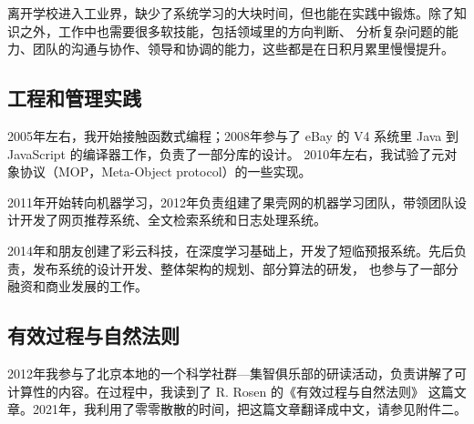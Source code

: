 \documentclass[a4paper,12pt]{article}
\numberwithin{problem}{section}
\numberwithin{definition}{section}
\numberwithin{lemma}{section}
\numberwithin{proposition}{section}
\numberwithin{theorem}{section}
\numberwithin{grammar}{section}
\numberwithin{program}{section}
\numberwithin{convention}{section}
\numberwithin{corollary}{section}
\begin{document}
离开学校进入工业界，缺少了系统学习的大块时间，但也能在实践中锻炼。除了知识之外，工作中也需要很多软技能，包括领域里的方向判断、
分析复杂问题的能力、团队的沟通与协作、领导和协调的能力，这些都是在日积月累里慢慢提升。

\subsection{工程和管理实践}

2005年左右，我开始接触函数式编程；2008年参与了 eBay 的 V4 系统里 Java 到 JavaScript 的编译器工作，负责了一部分库的设计。
2010年左右，我试验了元对象协议（MOP，Meta-Object protocol）的一些实现。

2011年开始转向机器学习，2012年负责组建了果壳网的机器学习团队，带领团队设计开发了网页推荐系统、全文检索系统和日志处理系统。

2014年和朋友创建了彩云科技，在深度学习基础上，开发了短临预报系统。先后负责，发布系统的设计开发、整体架构的规划、部分算法的研发，
也参与了一部分融资和商业发展的工作。

\subsection{有效过程与自然法则}

2012年我参与了北京本地的一个科学社群—集智俱乐部的研读活动，负责讲解了可计算性的内容。在过程中，我读到了 R. Rosen 的《有效过程与自然法则》
这篇文章。2021年，我利用了零零散散的时间，把这篇文章翻译成中文，请参见附件二。
\end{document}
